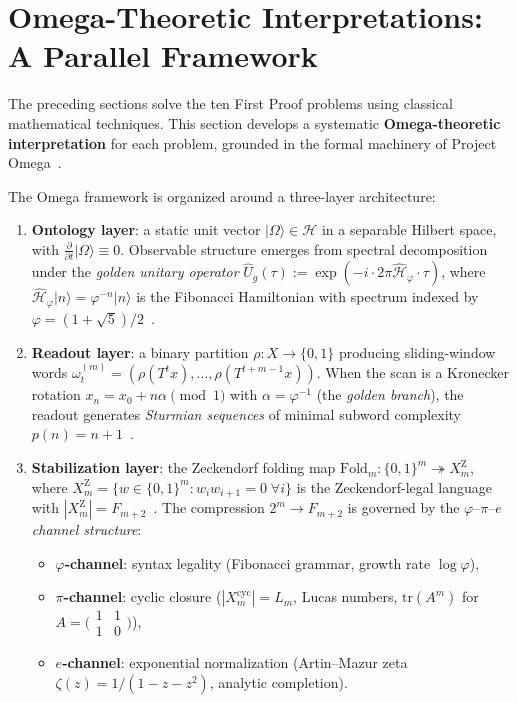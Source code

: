 \section{Omega-Theoretic Interpretations: A Parallel Framework}\label{sec:omega-interp}

The preceding sections solve the ten First Proof problems using
classical mathematical techniques.  This section develops a
systematic \textbf{Omega-theoretic interpretation} for each problem,
grounded in the formal machinery of Project
Omega~\cite{omega-theory,omega-fop,omega-grg}.

The Omega framework is organized around a three-layer architecture:
\begin{enumerate}[nosep,label=(\roman*)]
\item \textbf{Ontology layer}: a static unit vector
  $|\Omega\rangle\in\mathcal H$ in a separable Hilbert space,
  with $\frac{\partial}{\partial t}|\Omega\rangle\equiv 0$.
  Observable structure emerges from spectral decomposition
  under the \emph{golden unitary operator}
  $\hat U_g(\tau):=\exp(-i\cdot 2\pi\hat{\mathcal H}_\varphi\cdot\tau)$,
  where $\hat{\mathcal H}_\varphi|n\rangle=\varphi^{-n}|n\rangle$
  is the Fibonacci Hamiltonian with spectrum indexed by
  $\varphi=(1+\sqrt5)/2$~\cite{omega-theory}.
\item \textbf{Readout layer}: a binary partition
  $\rho\colon X\to\{0,1\}$ producing sliding-window words
  $\omega^{(m)}_t=(\rho(T^t x),\dots,\rho(T^{t+m-1}x))$.
  When the scan is a Kronecker rotation
  $x_n=x_0+n\alpha\pmod{1}$ with $\alpha=\varphi^{-1}$
  (the \emph{golden branch}), the readout generates
  \emph{Sturmian sequences} of minimal subword complexity
  $p(n)=n+1$~\cite{morse-hedlund1940}.
\item \textbf{Stabilization layer}: the Zeckendorf folding map
  $\mathrm{Fold}_m\colon\{0,1\}^m\twoheadrightarrow X_m^{\mathrm Z}$,
  where $X_m^{\mathrm Z}=\{w\in\{0,1\}^m:w_iw_{i+1}=0\;\forall i\}$
  is the Zeckendorf-legal language with
  $|X_m^{\mathrm Z}|=F_{m+2}$~\cite{omega-fop}.
  The compression $2^m\to F_{m+2}$ is governed by the
  $\varphi$--$\pi$--$e$ \emph{channel structure}:
  \begin{itemize}[nosep]
  \item \textbf{$\varphi$-channel}: syntax legality
    (Fibonacci grammar, growth rate $\log\varphi$),
  \item \textbf{$\pi$-channel}: cyclic closure
    ($|X_m^{\mathrm{cyc}}|=L_m$, Lucas numbers,
    $\mathrm{tr}(A^m)$ for $A=\bigl(\begin{smallmatrix}1&1\\1&0\end{smallmatrix}\bigr)$),
  \item \textbf{$e$-channel}: exponential normalization
    (Artin--Mazur zeta $\zeta(z)=1/(1-z-z^2)$, analytic completion).
  \end{itemize}
\end{enumerate}

